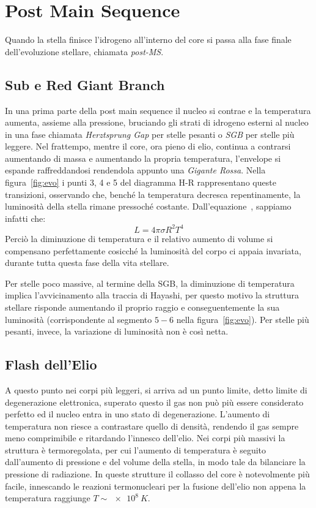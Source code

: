 \section{Post Main Sequence}\label{sec:post-main-sequence}
Quando la stella finisce l'idrogeno all'interno del core si passa alla fase finale dell'evoluzione stellare, chiamata \textit{post-MS}. 

\subsection{Sub e Red Giant Branch}\label{sec:SGB-RGB}
In una prima parte della post main sequence il nucleo si contrae e la temperatura aumenta, assieme alla pressione, bruciando gli strati di idrogeno esterni al nucleo in una fase chiamata \textit{Herztsprung Gap} per stelle pesanti o \textit{SGB} per stelle più leggere. Nel frattempo, mentre il core, ora pieno di elio, continua a contrarsi aumentando di massa e aumentando la propria temperatura, l'envelope si espande raffreddandosi rendendola appunto una \textit{Gigante Rossa}. Nella figura~\ref{fig:evo} i punti 3, 4 e 5 del diagramma H-R rappresentano queste transizioni, osservando che, benché la temperatura decresca repentinamente, la luminosità della stella rimane pressoché costante. Dall'equazione~, sappiamo infatti che:
\[
    L = 4\pi \sigma R^2 T^4
\]
Perciò la diminuzione di temperatura e il relativo aumento di volume si compensano perfettamente cosicché la luminosità del corpo ci appaia invariata, durante tutta questa fase della vita stellare.

Per stelle poco massive, al termine della SGB, la diminuzione di temperatura implica l'avvicinamento alla traccia di Hayashi, per questo motivo la struttura stellare risponde aumentando il proprio raggio e conseguentemente la sua luminosità (corrispondente al segmento $5-6$ nella figura~\ref{fig:evo}). Per stelle più pesanti, invece, la variazione di luminosità non è così netta. 
\subsection{Flash dell'Elio}\label{sec:flash-He e Horizontal Branch}

A questo punto nei corpi più leggeri, si arriva ad un punto limite, detto limite di degenerazione elettronica, superato questo il gas non può più essere considerato perfetto ed il nucleo entra in uno stato di degenerazione. L'aumento di temperatura non riesce a contrastare quello di densità, rendendo il gas sempre meno comprimibile e ritardando l'innesco dell'elio. Nei corpi più massivi la struttura è termoregolata, per cui l'aumento di temperatura è seguito dall'aumento di pressione e del volume della stella, in modo tale da bilanciare la pressione di radiazione. In queste strutture il collasso del core è notevolmente più facile, innescando le reazioni termonucleari per la fusione dell'elio non appena la temperatura raggiunge $T \sim \SI{e8}{K}$.


